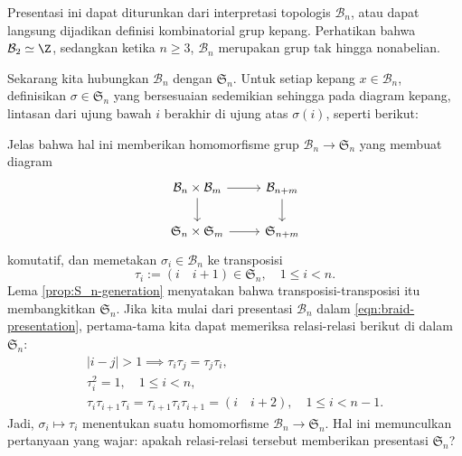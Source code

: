 Presentasi ini dapat diturunkan dari interpretasi topologis $\mathcal{B}_n$, atau dapat langsung dijadikan definisi kombinatorial grup kepang. Perhatikan bahwa $\mathcal{B}_2 \simeq \Z$, sedangkan ketika $n \geq 3$, $\mathcal{B}_n$ merupakan grup tak hingga nonabelian.

Sekarang kita hubungkan $\mathcal{B}_n$ dengan $\mathfrak{S}_n$. Untuk setiap kepang $x \in \mathcal{B}_n$, definisikan $\sigma \in \mathfrak{S}_n$ yang bersesuaian sedemikian sehingga pada diagram kepang, lintasan dari ujung bawah $i$ berakhir di ujung atas $\sigma(i)$, seperti berikut:
\begin{center}\end{center}
Jelas bahwa hal ini memberikan homomorfisme grup $\mathcal{B}_n \to \mathfrak{S}_n$ yang membuat diagram
\[\begin{tikzcd}
	\mathcal{B}_n \times \mathcal{B}_m \arrow[r] \arrow[d] & \mathcal{B}_{n+m} \arrow[d] \\
	\mathfrak{S}_n \times \mathfrak{S}_m \arrow[r] & \mathfrak{S}_{n+m}
\end{tikzcd}\]
komutatif, dan memetakan $\sigma_i \in \mathcal{B}_n$ ke transposisi
\[ \tau_i := (i \quad i+1) \in \mathfrak{S}_n, \quad 1 \leq i < n. \]
Lema \ref{prop:S_n-generation} menyatakan bahwa transposisi-transposisi itu membangkitkan $\mathfrak{S}_n$. Jika kita mulai dari presentasi $\mathcal{B}_n$ dalam \eqref{eqn:braid-presentation}, pertama-tama kita dapat memeriksa relasi-relasi berikut di dalam $\mathfrak{S}_n$:
\begin{gather*}
	|i-j| > 1 \implies \tau_i \tau_j = \tau_j \tau_i, \\
	\tau_i^2 = 1, \quad 1 \leq i < n, \\
	\tau_i \tau_{i+1} \tau_i = \tau_{i+1} \tau_i \tau_{i+1} = (i \quad i+2), \quad 1 \leq i < n-1.
\end{gather*}
Jadi, $\sigma_i \mapsto \tau_i$ menentukan suatu homomorfisme $\mathcal{B}_n \to \mathfrak{S}_n$. Hal ini memunculkan pertanyaan yang wajar: apakah relasi-relasi tersebut memberikan presentasi $\mathfrak{S}_n$?

